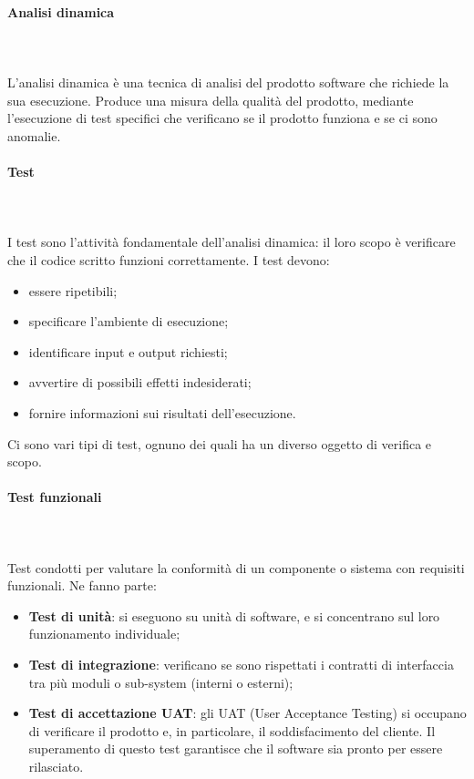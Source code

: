 \paragraph*{Analisi dinamica} \mbox{} \\ \mbox{} \\
L'analisi dinamica è una tecnica di analisi del prodotto software che richiede la sua esecuzione. Produce una misura della qualità del prodotto, mediante l'esecuzione di test specifici che verificano se il prodotto funziona e se ci sono anomalie.

\paragraph{Test} \mbox{} \\ \mbox{} \\
I test sono l'attività fondamentale dell'analisi dinamica: il loro scopo è verificare che il codice
scritto funzioni correttamente. I test devono:
\begin{itemize}
\item essere ripetibili;
\item specificare l'ambiente di esecuzione;
\item identificare input e output richiesti;
\item avvertire di possibili effetti indesiderati;
\item fornire informazioni sui risultati dell'esecuzione.
\end{itemize}
Ci sono vari tipi di test, ognuno dei quali ha un diverso oggetto di verifica e scopo.

\paragraph*{Test funzionali} \mbox{} \\ \mbox{} \\
Test condotti per valutare la conformità di un componente o sistema con requisiti funzionali. Ne fanno parte: \begin{itemize}
\item \textbf{Test di unità\glo}: si eseguono su unità di software, e si concentrano sul loro funzionamento individuale;
\item \textbf{Test di integrazione}: verificano se sono rispettati i contratti di interfaccia tra più moduli o sub-system (interni o esterni);
\item \textbf{Test di accettazione UAT}: gli UAT (User Acceptance Testing) si occupano di verificare il prodotto e, in particolare, il soddisfacimento del cliente. Il superamento di questo test garantisce che il software sia pronto per essere rilasciato.
\end{itemize}

